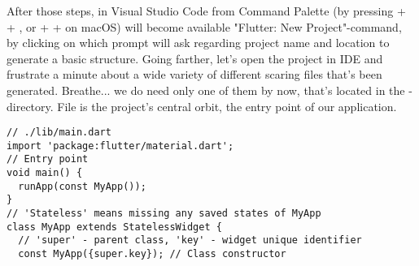 After those steps, in Visual Studio Code from Command Palette (by pressing  +  + , or 
 +  +  on macOS) will become available "Flutter: New Project"-command, by clicking on which 
prompt will ask regarding project name and location to generate a basic structure. Going farther, let's open the project 
in IDE and frustrate a minute about a wide variety of different scaring files that's been generated. Breathe... we do 
need only one of them by now, that's located in the -directory. File  is the project's central 
orbit, the entry point of our application.

\begin{lstlisting}
// ./lib/main.dart
import 'package:flutter/material.dart';
// Entry point
void main() {
  runApp(const MyApp());
}
// 'Stateless' means missing any saved states of MyApp
class MyApp extends StatelessWidget {
  // 'super' - parent class, 'key' - widget unique identifier
  const MyApp({super.key}); // Class constructor
  

\end{lstlisting}
